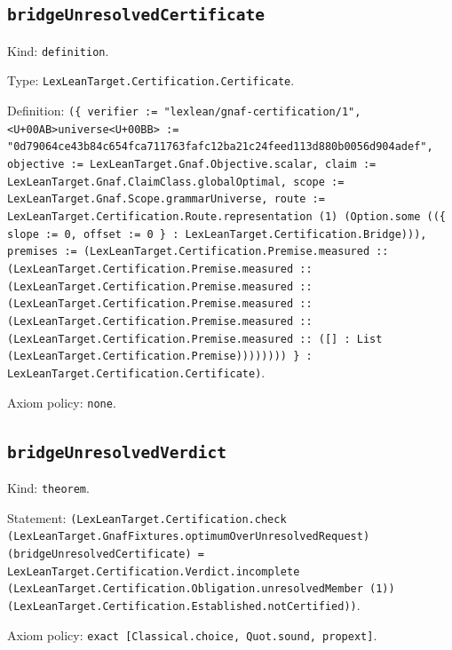\documentclass[11pt]{article}
\begin{document}
\subsection*{\texttt{bridgeUnresolvedCertificate}}
\noindent Kind: \texttt{definition}.\par
\noindent Type: \texttt{LexLeanTarget.Certification.Certificate}.\par
\noindent Definition: \texttt{(\{ verifier := "lexlean/gnaf-certification/1", <U+00AB>universe<U+00BB> := "0d79064ce43b84c654fca711763fafc12ba21c24feed113d880b0056d904adef", objective := LexLeanTarget.Gnaf.Objective.scalar, claim := LexLeanTarget.Gnaf.ClaimClass.globalOptimal, scope := LexLeanTarget.Gnaf.Scope.grammarUniverse, route := LexLeanTarget.Certification.Route.representation (1) (Option.some ((\{ slope := 0, offset := 0 \} : LexLeanTarget.Certification.Bridge))), premises := (LexLeanTarget.Certification.Premise.measured :: (LexLeanTarget.Certification.Premise.measured :: (LexLeanTarget.Certification.Premise.measured :: (LexLeanTarget.Certification.Premise.measured :: (LexLeanTarget.Certification.Premise.measured :: (LexLeanTarget.Certification.Premise.measured :: ([] : List (LexLeanTarget.Certification.Premise)))))))) \} : LexLeanTarget.Certification.Certificate)}.\par
\noindent Axiom policy: \texttt{none}.\par
\subsection*{\texttt{bridgeUnresolvedVerdict}}
\noindent Kind: \texttt{theorem}.\par
\noindent Statement: \texttt{(LexLeanTarget.Certification.check (LexLeanTarget.GnafFixtures.optimumOverUnresolvedRequest) (bridgeUnresolvedCertificate) = LexLeanTarget.Certification.Verdict.incomplete (LexLeanTarget.Certification.Obligation.unresolvedMember (1)) (LexLeanTarget.Certification.Established.notCertified))}.\par
\noindent Axiom policy: \texttt{exact [Classical.choice, Quot.sound, propext]}.\par
\end{document}
